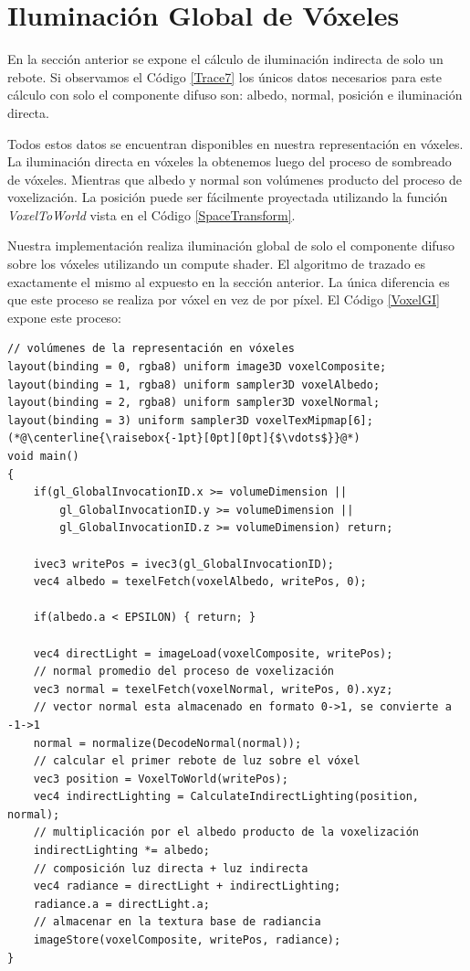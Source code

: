 \section{Iluminación Global de Vóxeles} %
\label{sec:iluminacion_global_de_voxeles_impl}
En la sección anterior se expone el cálculo de iluminación indirecta de solo un rebote. Si observamos el Código \ref{Trace7} los únicos datos necesarios para este cálculo con solo el componente difuso son: albedo, normal, posición e iluminación directa.

Todos estos datos se encuentran disponibles en nuestra representación en vóxeles. La iluminación directa en vóxeles la obtenemos luego del proceso de sombreado de vóxeles. Mientras que albedo y normal son volúmenes producto del proceso de voxelización. La posición puede ser fácilmente proyectada utilizando la función \emph{VoxelToWorld} vista en el Código \ref{SpaceTransform}.

Nuestra implementación realiza iluminación global de solo el componente difuso sobre los vóxeles utilizando un compute shader. El algoritmo de trazado es exactamente el mismo al expuesto en la sección anterior. La única diferencia es que este proceso se realiza por vóxel en vez de por píxel. El Código \ref{VoxelGI} expone este proceso:
\\
\begin{lstlisting}[caption={Iluminacion global sobre voxeles.}, label=VoxelGI]
// volúmenes de la representación en vóxeles
layout(binding = 0, rgba8) uniform image3D voxelComposite;
layout(binding = 1, rgba8) uniform sampler3D voxelAlbedo;
layout(binding = 2, rgba8) uniform sampler3D voxelNormal;
layout(binding = 3) uniform sampler3D voxelTexMipmap[6];
(*@\centerline{\raisebox{-1pt}[0pt][0pt]{$\vdots$}}@*)
void main()
{
    if(gl_GlobalInvocationID.x >= volumeDimension ||
        gl_GlobalInvocationID.y >= volumeDimension ||
        gl_GlobalInvocationID.z >= volumeDimension) return;

    ivec3 writePos = ivec3(gl_GlobalInvocationID);
    vec4 albedo = texelFetch(voxelAlbedo, writePos, 0);

    if(albedo.a < EPSILON) { return; }

    vec4 directLight = imageLoad(voxelComposite, writePos);
    // normal promedio del proceso de voxelización
    vec3 normal = texelFetch(voxelNormal, writePos, 0).xyz;
    // vector normal esta almacenado en formato 0->1, se convierte a -1->1
    normal = normalize(DecodeNormal(normal));
    // calcular el primer rebote de luz sobre el vóxel
    vec3 position = VoxelToWorld(writePos);
    vec4 indirectLighting = CalculateIndirectLighting(position, normal);
    // multiplicación por el albedo producto de la voxelización
    indirectLighting *= albedo;
    // composición luz directa + luz indirecta
    vec4 radiance = directLight + indirectLighting;
    radiance.a = directLight.a;
    // almacenar en la textura base de radiancia
    imageStore(voxelComposite, writePos, radiance);
}
\end{lstlisting}

